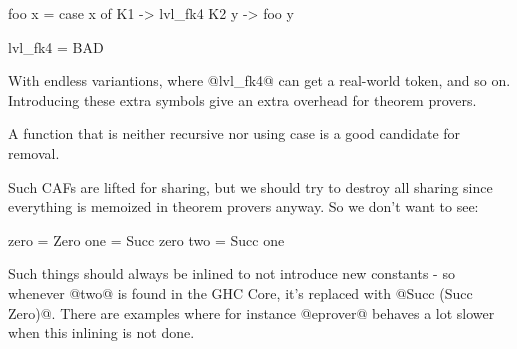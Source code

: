 \begin{code}
foo x = case x of
    K1 -> lvl_fk4
    K2 y -> foo y

lvl_fk4 = BAD
\end{code}

With endless variantions, where @lvl_fk4@ can get a real-world token,
and so on. Introducing these extra symbols give an extra overhead for
theorem provers.

A function that is neither recursive nor using case is a good
candidate for removal.

Such CAFs are lifted for sharing, but we should try to destroy all
sharing since everything is memoized in theorem provers anyway. So we
don't want to see:

\begin{code}
zero = Zero
one = Succ zero
two = Succ one
\end{code}

Such things should always be inlined to not introduce new constants -
so whenever @two@ is found in the GHC Core, it's replaced with
@Succ (Succ Zero)@.
There are examples where for instance @eprover@ behaves a lot slower
when this inlining is not done.

